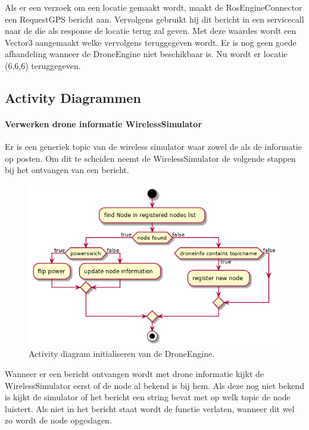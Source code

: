 \documentclass[a4paper, 11pt, oneside]{report}
\begin{document}
Als er een verzoek om een locatie gemaakt wordt, maakt de RosEngineConnector een RequestGPS bericht aan. 
Vervolgens gebruikt hij dit bericht in een servicecall naar de  die als response de locatie terug zal geven. 
Met deze waardes wordt een Vector3 aangemaakt welke vervolgens teruggegeven wordt.
Er is nog geen goede afhandeling wanneer de DroneEngine niet beschikbaar is. Nu wordt er locatie (6,6,6) teruggegeven.


\subsection{Activity Diagrammen}
\label{DetailedDesign:ros:activity}

\paragraph{Verwerken drone informatie WirelessSimulator}
\label{DetailedDesign:ros:Activity:droneinfo}
Er is een generiek topic van de wireless simulator waar zowel de  als de  informatie op posten. Om dit te scheiden neemt de WirelessSimulator de volgende stappen bij het ontvangen van een bericht. 
\begin{figure}[H]
	\begin{center}\includegraphics[width=.6\linewidth]{UML/out/ros/activity/processDroneInfo/processDroneInfo.png}\end{center}
	\caption{Activity diagram initialiseren van de DroneEngine.}
	\label{fig:communication:MeshNetwerk:Activity:initialiserenDrone}
\end{figure}

Wanneer er een bericht ontvangen wordt met drone informatie kijkt de WirelessSimulator eerst of de node al bekend is bij hem.
Als deze nog niet bekend is kijkt de simulator of het bericht een string bevat met op welk topic de node luistert. 
Als niet in het bericht staat wordt de functie verlaten, wanneer dit wel zo wordt de node opgeslagen.
\end{document}
